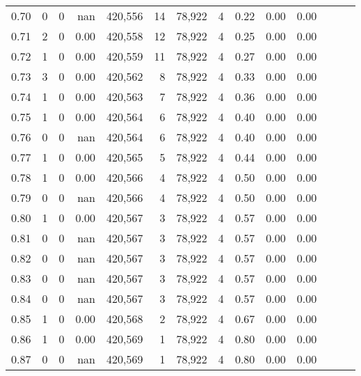 \begin{tabular}{rrrrrrrrrrrrrr}
0.70 &       0 &      0 &   nan &  420,556 &       14 &  78,922 &       4 &  0.22 &  0.00 &      0.00 \\
0.71 &       2 &      0 &  0.00 &  420,558 &       12 &  78,922 &       4 &  0.25 &  0.00 &      0.00 \\
0.72 &       1 &      0 &  0.00 &  420,559 &       11 &  78,922 &       4 &  0.27 &  0.00 &      0.00 \\
0.73 &       3 &      0 &  0.00 &  420,562 &        8 &  78,922 &       4 &  0.33 &  0.00 &      0.00 \\
0.74 &       1 &      0 &  0.00 &  420,563 &        7 &  78,922 &       4 &  0.36 &  0.00 &      0.00 \\
0.75 &       1 &      0 &  0.00 &  420,564 &        6 &  78,922 &       4 &  0.40 &  0.00 &      0.00 \\
0.76 &       0 &      0 &   nan &  420,564 &        6 &  78,922 &       4 &  0.40 &  0.00 &      0.00 \\
0.77 &       1 &      0 &  0.00 &  420,565 &        5 &  78,922 &       4 &  0.44 &  0.00 &      0.00 \\
0.78 &       1 &      0 &  0.00 &  420,566 &        4 &  78,922 &       4 &  0.50 &  0.00 &      0.00 \\
0.79 &       0 &      0 &   nan &  420,566 &        4 &  78,922 &       4 &  0.50 &  0.00 &      0.00 \\
0.80 &       1 &      0 &  0.00 &  420,567 &        3 &  78,922 &       4 &  0.57 &  0.00 &      0.00 \\
0.81 &       0 &      0 &   nan &  420,567 &        3 &  78,922 &       4 &  0.57 &  0.00 &      0.00 \\
0.82 &       0 &      0 &   nan &  420,567 &        3 &  78,922 &       4 &  0.57 &  0.00 &      0.00 \\
0.83 &       0 &      0 &   nan &  420,567 &        3 &  78,922 &       4 &  0.57 &  0.00 &      0.00 \\
0.84 &       0 &      0 &   nan &  420,567 &        3 &  78,922 &       4 &  0.57 &  0.00 &      0.00 \\
0.85 &       1 &      0 &  0.00 &  420,568 &        2 &  78,922 &       4 &  0.67 &  0.00 &      0.00 \\
0.86 &       1 &      0 &  0.00 &  420,569 &        1 &  78,922 &       4 &  0.80 &  0.00 &      0.00 \\
0.87 &       0 &      0 &   nan &  420,569 &        1 &  78,922 &       4 &  0.80 &  0.00 &      0.00 \\

\end{tabular}
